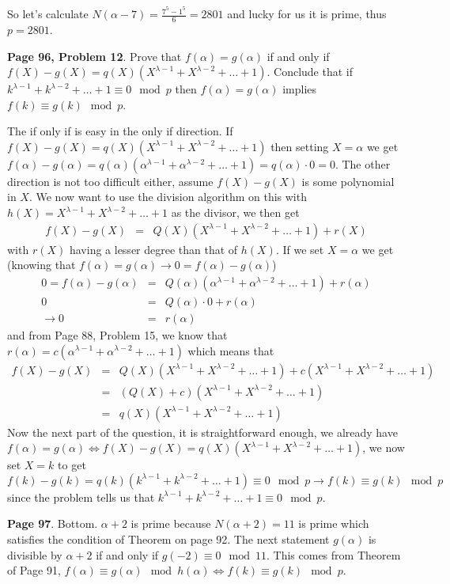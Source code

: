 \documentclass[aps,preprint,preprintnumbers,nofootinbib,showpacs,prd]{revtex4-1}
\newcommand{\nbea}{\begin{eqnarray*}}
\newcommand{\neea}{\end{eqnarray*}}
\begin{document}
So let's calculate $N(\alpha - 7) = \frac{7^5 - 1^5}{6} = 2801$ and lucky for us it is prime, thus $p = 2801$.

{\bf Page 96, Problem 12}. Prove that $f(\alpha) = g(\alpha)$ if and only if $f(X) - g(X) = q(X)(X^{\lambda - 1} + X^{\lambda-2} + \dots + 1)$. Conclude that if $k^{\lambda-1} + k^{\lambda-2} + \dots + 1 \equiv 0 \mod{p}$ then $f(\alpha) = g(\alpha)$ implies $f(k) \equiv g(k) \mod{p}$.

The if only if is easy in the only if direction. If $f(X) - g(X) = q(X)(X^{\lambda - 1} + X^{\lambda-2} + \dots + 1)$ then setting $X = \alpha$ we get $f(\alpha) - g(\alpha) = q(\alpha)(\alpha^{\lambda - 1} + \alpha^{\lambda-2} + \dots + 1) = q(\alpha) \cdot 0 = 0$. The other direction is not too difficult either, assume $f(X) - g(X)$ is some polynomial in $X$. We now want to use the division algorithm on this with $h(X) = X^{\lambda - 1} + X^{\lambda-2} + \dots + 1$ as the divisor, we then get
%
\nbea
f(X) - g(X) & = & Q(X)(X^{\lambda - 1} + X^{\lambda-2} + \dots + 1) + r(X)
\neea
%
with $r(X)$ having a lesser degree than that of $h(X)$. If we set $X = \alpha$ we get (knowing that $f(\alpha) = g(\alpha) \to 0 = f(\alpha) - g(\alpha)$)
%
\nbea
0 = f(\alpha) - g(\alpha) & = & Q(\alpha)(\alpha^{\lambda - 1} + \alpha^{\lambda-2} + \dots + 1) + r(\alpha) \\
0 & = & Q(\alpha) \cdot 0 + r(\alpha) \\
\to 0 & = & r(\alpha)
\neea
%
and from Page 88, Problem 15, we know that $r(\alpha) = c(\alpha^{\lambda - 1} + \alpha^{\lambda-2} + \dots + 1)$ which means that
%
\nbea
f(X) - g(X) & = & Q(X)(X^{\lambda - 1} + X^{\lambda-2} + \dots + 1) + c(X^{\lambda - 1} + X^{\lambda-2} + \dots + 1) \\
& = & (Q(X) + c)(X^{\lambda - 1} + X^{\lambda-2} + \dots + 1) \\
& = & q(X)(X^{\lambda - 1} + X^{\lambda-2} + \dots + 1)
\neea
%
Now the next part of the question, it is straightforward enough, we already have $f(\alpha) = g(\alpha) \Longleftrightarrow f(X) - g(X) = q(X)(X^{\lambda - 1} + X^{\lambda-2} + \dots + 1)$, we now set $X = k$ to get $f(k) - g(k) = q(k)(k^{\lambda - 1} + k^{\lambda-2} + \dots + 1) \equiv 0 \mod{p} \to f(k) \equiv g(k) \mod{p}$ since the problem tells us that $k^{\lambda-1} + k^{\lambda-2} + \dots + 1 \equiv 0 \mod{p}$.

{\bf Page 97}. Bottom. $\alpha + 2$ is prime because $N(\alpha + 2) = 11$ is prime which satisfies the condition of Theorem on page 92. The next statement $g(\alpha)$ is divisible by $\alpha + 2$ if and only if $g(-2) \equiv 0 \mod{11}$. This comes from Theorem of Page 91, $f(\alpha) \equiv g(\alpha) \mod{h(\alpha)} \Longleftrightarrow f(k) \equiv g(k) \mod{p}$.
\end{document}
